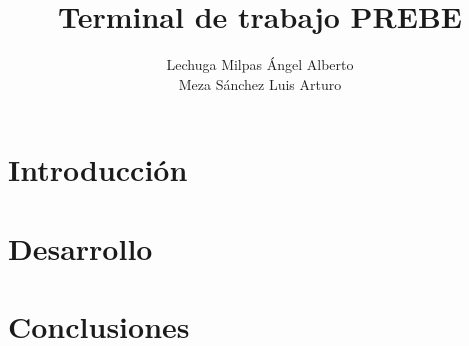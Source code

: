 \documentclass[titlepage]{article}
\title{Terminal de trabajo PREBE}
\author{Lechuga Milpas Ángel Alberto \\ Meza Sánchez Luis Arturo }
\begin{document}
\maketitle

\tableofcontents

\section{Introducción}

\section{Desarrollo}

\section{Conclusiones}
\end{document}
